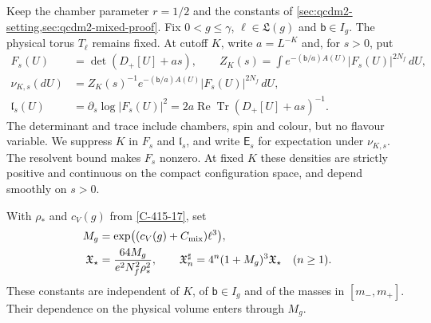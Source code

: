 \documentclass[11pt,letterpaper,reqno]{amsart}
\theoremstyle{definition}
\theoremstyle{remark}
\begin{document}
Keep the chamber parameter $r=1/2$ and the constants of
\cref{sec:qcdm2-setting,sec:qcdm2-mixed-proof}. Fix
$0<g\le\gamma$, $\ell\in\mathfrak L(g)$ and
$\mathsf b\in I_g$. The physical torus $T_\ell$ remains fixed.
At cutoff $K$, write $a=L^{-K}$ and, for $s>0$, put
\begin{align}
 F_s(U)&=\det(D_+[U]+as),\qquad
 Z_K(s)=\int e^{-(\mathsf b/a)A(U)}|F_s(U)|^{2N_f}\,dU,
 \label{eq:qcdm2-mass-partition}\\
 \nu_{K,s}(dU)&=Z_K(s)^{-1}
       e^{-(\mathsf b/a)A(U)}|F_s(U)|^{2N_f}\,dU,
 \label{eq:qcdm2-mass-law}\\
 \mathfrak l_s(U)&=\partial_s\log|F_s(U)|^2
       =2a\operatorname{Re}\operatorname{Tr}(D_+[U]+as)^{-1}.
 \label{eq:qcdm2-mass-loop}
\end{align}
The determinant and trace include chambers, spin and colour,
but no flavour variable. We suppress $K$ in $F_s$ and
$\mathfrak l_s$, and write $\mathsf E_s$ for expectation under
$\nu_{K,s}$. The resolvent bound makes $F_s$ nonzero. At fixed
$K$ these densities are strictly positive and continuous on
the compact configuration space, and depend smoothly on
$s>0$.

With $\rho_*$ and $c_V(g)$ from \cref{C-415-17}, set
\begin{equation}\label{eq:qcdm2-mass-constants}
 \begin{split}
 M_g&=\exp\bigl((c_V(g)+C_{\rm mix})\ell^3\bigr),\\
 \mathfrak X_\star&=\frac{64M_g}{e^2N_f^2\rho_*^2},\qquad
 \mathfrak X_n^\sharp=4^n(1+M_g)^3\mathfrak X_\star
                       \quad(n\ge1).
 \end{split}
\end{equation}
These constants are independent of $K$, of
$\mathsf b\in I_g$ and of the masses in $[m_-,m_+]$.
Their dependence on the physical volume enters through $M_g$.
\end{document}
